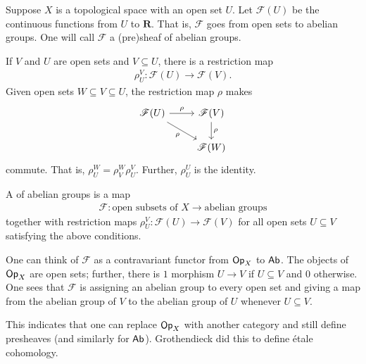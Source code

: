 \documentclass [11 pt, oneside, margin = 1 in] {article}
\begin{document}
\begin{example}[Motivation]\label{}\text{}
Suppose $X$ is a topological space with an open set $U$. Let $\mathscr{F}(U)$ be the continuous functions from $U$ to $\mathbf{R}$. That is, $\mathscr{F}$ goes from open sets to abelian groups. One will call $\mathscr{F}$ a (pre)sheaf of abelian groups. 

If $V$ and $U$ are open sets and $V\subseteq U$, there is a restriction map
\begin{align*}
	\rho_{U}^V : \mathscr{F}(U)  \longrightarrow \mathscr{F}(V).
\end{align*}
Given open sets $W\subseteq V\subseteq U$, the restriction map $\rho$ makes
\[
\begin{tikzcd}
	\mathscr{F}(U)\ar[r,"\rho"] \ar[dr,"\rho", swap] &  \mathscr{F}(V)\ar[d,"\rho"] \\
						   & \mathscr{F}(W)
\end{tikzcd}
\]
commute. That is, $\rho_{U}^W = \rho_{V}^W \rho_{U}^V$. Further, $\rho_{U}^U$ is the identity.

A  of abelian groups is a map
\begin{align*}
	\mathscr{F} : \textrm{open subsets of $X$} \longrightarrow \textrm{abelian groups}
\end{align*}
together with restriction maps $\rho_{U}^V : \mathscr{F}(U) \longrightarrow  \mathscr{F}(V)$ for all open sets $U\subseteq V$ satisfying the above conditions. 
\end{example}

One can think of $\mathscr{F}$ as a contravariant functor from $\textsf{Op}_X$ to $\textsf{Ab}$. The objects of $\textsf{Op}_X$ are open sets; further, there is $1$ morphism $U\longrightarrow V$ if $U\subseteq V$ and $0$ otherwise. One sees that $\mathscr{F}$ is assigning an abelian group to every open set and giving a map from the abelian group of $V$ to the abelian group of $U$ whenever $U\subseteq V$.

\begin{remark}
	This indicates that one can replace $\textsf{Op}_X$ with another category and still define presheaves (and similarly for $\textsf{Ab}$). Grothendieck did this to define \'etale cohomology.
\end{remark}
\end{document}
